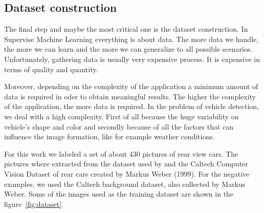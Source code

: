 \subsection{Dataset construction} %
\label{sub:data-set}

The final step and maybe the most critical one is the dataset construction. In
Supervise Machine Learning everything is about data. The more data we handle,
the more we can learn and the more we can generalize to all possible scenarios.
Unfortunately, gathering data is usually very expensive process. It is expensive
in terms of quality and quantity.

Moreover, depending on the complexity of the application a minimum amount of data 
is required in oder to obtain meaningful results. The higher the complexity of the 
application, the more data is required. In the problem of vehicle detection, we
deal with a high complexity. First of all because the huge variability on
vehicle's shape and color and secondly because of all the factors that can
influence the image formation, like for example weather conditions.

For this work we labeled a set of about 430 pictures of rear view cars. The
pictures where extracted from the dataset used by \cite{tme} and the Caltech
Computer Vision Dataset of rear cars created by Markus Weber (1999). For the
negative examples, we used the Caltech background dataset, also collected by
Markus Weber. Some of the images used as the training dataset are shown in 
the figure~\ref{fig:dataset}.


